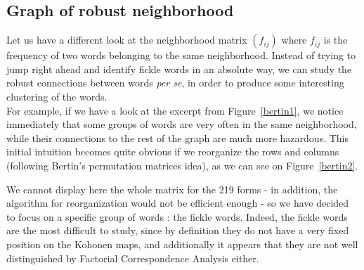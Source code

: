 \documentclass[preprint]{elsarticle}
\begin{document}
\subsection{Graph of robust neighborhood}

Let us have a different look at the neighborhood matrix $(f_{ij})$ where $f_{ij}$ is the frequency of two words  belonging to the same neighborhood. Instead of trying to jump right ahead and identify fickle words in an absolute way, we can study the robust connections between words \textit{per se}, in order to produce some interesting clustering of the words.\\

For example, if we have a look at the excerpt from Figure~\ref{bertin1}, we notice immediately that some groups of words are very often in the same neighborhood, while their connections to the rest of the graph are much more hazardous. This initial intuition becomes quite obvious if we reorganize the rows and columns (following Bertin's permutation matrices idea), as we can see on Figure~\ref{bertin2}.

We cannot display here the whole matrix for the 219 forms - in addition, the algorithm for reorganization would not be efficient enough - so we have decided to focus on a specific group of words : the fickle words. Indeed, the fickle words are the most difficult to study, since by definition they do not have a very fixed position on the Kohonen maps, and additionally it appears that they are not well distinguished by Factorial Correspondence Analysis either.
\end{document}
